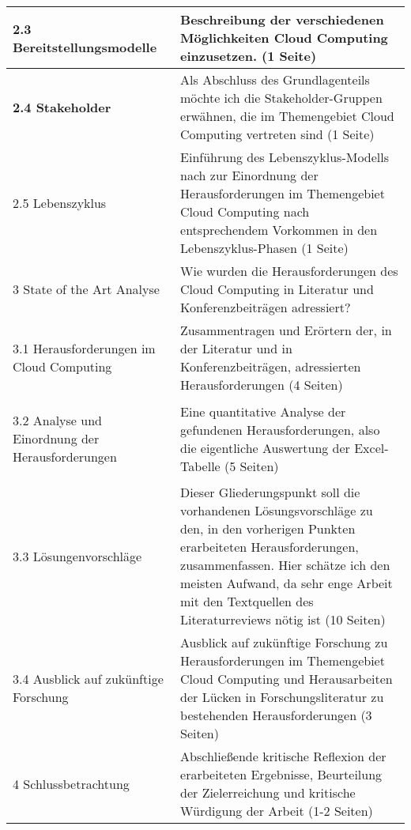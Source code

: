 \documentclass[
	a4paper,
	oneside,
	12pt,
	liststotocnumbered
]{article}
\let\cite\textcite
\begin{document}
\begin{longtable}{>{\bfseries}p{5.2cm} p{9.1cm}}
    2.3 Bereitstellungsmodelle & Beschreibung der verschiedenen Möglichkeiten Cloud Computing einzusetzen. (1 Seite)\\\hline
    
    2.4 Stakeholder & Als Abschluss des Grundlagenteils möchte ich die Stakeholder-Gruppen erwähnen, die im Themengebiet Cloud Computing vertreten sind (1 Seite)\\\hline
    
    2.5 Lebenszyklus & Einführung des Lebenszyklus-Modells nach \cite{Schneider.2013} zur Einordnung der Herausforderungen im Themengebiet Cloud Computing nach entsprechendem Vorkommen in den Lebenszyklus-Phasen (1 Seite)  \\\hline\hline
    
    3 State of the Art Analyse & Wie wurden die Herausforderungen des Cloud Computing in Literatur und Konferenzbeiträgen adressiert?\\\hline
    
    3.1 Herausforderungen im Cloud Computing & Zusammentragen und Erörtern der, in der Literatur und in Konferenzbeiträgen, adressierten Herausforderungen (4 Seiten)\\\hline
    
    3.2 Analyse und Einordnung der Herausforderungen & Eine quantitative Analyse der gefundenen Herausforderungen, also die eigentliche Auswertung der Excel-Tabelle (5 Seiten)\\\hline

    3.3 Lösungenvorschläge & Dieser Gliederungspunkt soll die vorhandenen Lösungsvorschläge zu den, in den vorherigen Punkten erarbeiteten Herausforderungen, zusammenfassen. Hier schätze ich den meisten Aufwand, da sehr enge Arbeit mit den Textquellen des Literaturreviews nötig ist (10 Seiten)\\\hline
    
    3.4 Ausblick auf zukünftige Forschung & Ausblick auf zukünftige Forschung zu Herausforderungen im Themengebiet Cloud Computing und Herausarbeiten der Lücken in Forschungsliteratur zu bestehenden Herausforderungen (3 Seiten) \\\hline\hline
    
    4 Schlussbetrachtung & Abschließende kritische Reflexion der erarbeiteten Ergebnisse, Beurteilung der Zielerreichung und kritische  Würdigung der Arbeit (1-2 Seiten)
\end{longtable}

\end{document}
